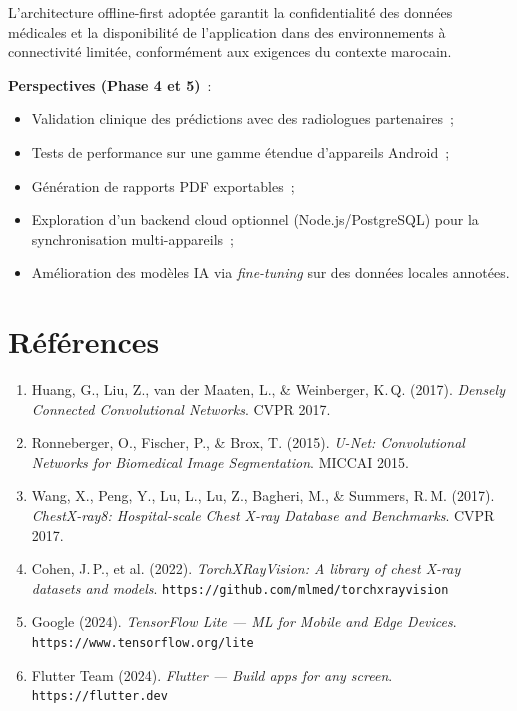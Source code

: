 \documentclass[12pt, a4paper]{report}
\begin{document}
L'architecture offline-first adoptée garantit la confidentialité des données
médicales et la disponibilité de l'application dans des environnements à
connectivité limitée, conformément aux exigences du contexte marocain.

\vspace{1em}
\noindent\textbf{Perspectives (Phase 4 et 5)}~:
\begin{itemize}
  \item Validation clinique des prédictions avec des radiologues partenaires~;
  \item Tests de performance sur une gamme étendue d'appareils Android~;
  \item Génération de rapports PDF exportables~;
  \item Exploration d'un backend cloud optionnel (Node.js/PostgreSQL) pour
        la synchronisation multi-appareils~;
  \item Amélioration des modèles IA via \textit{fine-tuning} sur des données
        locales annotées.
\end{itemize}

\chapter*{Références}

\begin{enumerate}
  \item Huang, G., Liu, Z., van der Maaten, L., \& Weinberger, K.\,Q. (2017).
        \textit{Densely Connected Convolutional Networks}. CVPR 2017.

  \item Ronneberger, O., Fischer, P., \& Brox, T. (2015).
        \textit{U-Net: Convolutional Networks for Biomedical Image Segmentation}.
        MICCAI 2015.

  \item Wang, X., Peng, Y., Lu, L., Lu, Z., Bagheri, M., \& Summers, R.\,M.
        (2017). \textit{ChestX-ray8: Hospital-scale Chest X-ray Database and
        Benchmarks}. CVPR 2017.

  \item Cohen, J.\,P., et al. (2022). \textit{TorchXRayVision: A library of
        chest X-ray datasets and models}.
        \texttt{https://github.com/mlmed/torchxrayvision}

  \item Google (2024). \textit{TensorFlow Lite — ML for Mobile and Edge
        Devices}. \texttt{https://www.tensorflow.org/lite}

  \item Flutter Team (2024). \textit{Flutter — Build apps for any screen}.
        \texttt{https://flutter.dev}
\end{enumerate}
\end{document}
